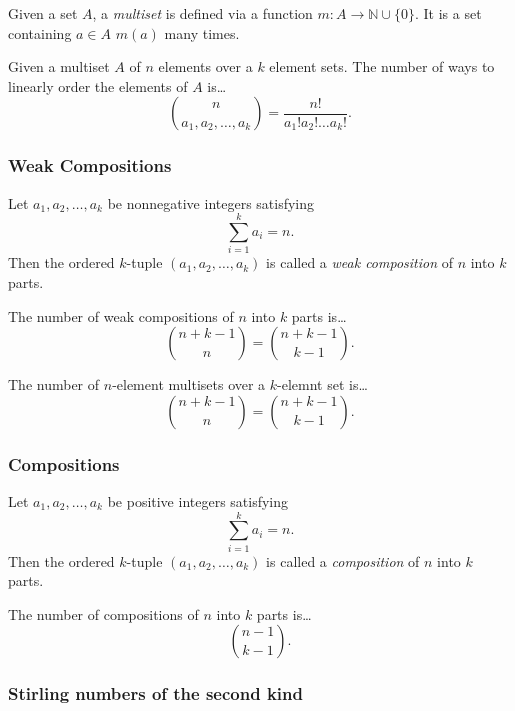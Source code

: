 Given a set $A$, a \emph{multiset} is defined via a function $m : A \rightarrow \mathbb{N} \cup \{ 0 \}$. It is a set containing $a \in A$ $m(a)$ many times.


\begin{theorem}
Given a multiset $A$ of $n$ elements over a $k$ element sets. The number of ways to linearly order the elements of $A$ is\dots
$${n \choose a_1,a_2,\dots,a_k} = \frac{n!}{a_1!a_2!\dots a_k!}.$$
\end{theorem}

\subsubsection{Weak Compositions}\label{weakcompositions}

Let $a_1,a_2,\dots,a_k$ be nonnegative integers satisfying
$$\sum^k_{i=1} a_i = n.$$
Then the ordered $k$-tuple $(a_1,a_2,\dots,a_k)$ is called a \emph{weak composition} of $n$ into $k$ parts.

\begin{theorem}
The number of weak compositions of $n$ into $k$ parts is\dots
$${n + k - 1 \choose n} = {n + k - 1 \choose k - 1}.$$
\end{theorem}

\begin{corollary}
The number of $n$-element multisets over a $k$-elemnt set is\dots
$${n + k - 1 \choose n} = {n + k - 1 \choose k - 1}.$$
\end{corollary}

\subsubsection{Compositions}\label{compositions}

Let $a_1,a_2,\dots,a_k$ be positive integers satisfying
$$\sum^k_{i=1} a_i = n.$$
Then the ordered $k$-tuple $(a_1,a_2,\dots,a_k)$ is called a \emph{composition} of $n$ into $k$ parts.

\begin{corollary}
The number of compositions of $n$ into $k$ parts is\dots
$${n - 1 \choose k - 1}.$$
\end{corollary}

\subsubsection{Stirling numbers of the second kind}\label{secondstirlingnumbers}


